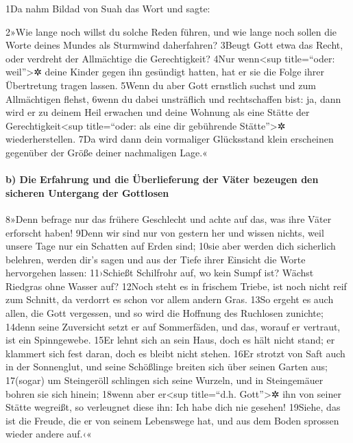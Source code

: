 1Da nahm Bildad von Suah das Wort und sagte:

2»Wie lange noch willst du solche Reden führen, und wie lange noch
sollen die Worte deines Mundes als Sturmwind daherfahren? 3Beugt Gott
etwa das Recht, oder verdreht der Allmächtige die Gerechtigkeit? 4Nur
wenn\textless sup title=``oder: weil''\textgreater✲ deine Kinder gegen
ihn gesündigt hatten, hat er sie die Folge ihrer Übertretung tragen
lassen. 5Wenn du aber Gott ernstlich suchst und zum Allmächtigen flehst,
6wenn du dabei unsträflich und rechtschaffen bist: ja, dann wird er zu
deinem Heil erwachen und deine Wohnung als eine Stätte der
Gerechtigkeit\textless sup title=``oder: als eine dir gebührende
Stätte''\textgreater✲ wiederherstellen. 7Da wird dann dein vormaliger
Glücksstand klein erscheinen gegenüber der Größe deiner nachmaligen
Lage.«

\hypertarget{b-die-erfahrung-und-die-uxfcberlieferung-der-vuxe4ter-bezeugen-den-sicheren-untergang-der-gottlosen}{%
\paragraph{b) Die Erfahrung und die Überlieferung der Väter bezeugen den
sicheren Untergang der
Gottlosen}\label{b-die-erfahrung-und-die-uxfcberlieferung-der-vuxe4ter-bezeugen-den-sicheren-untergang-der-gottlosen}}

8»Denn befrage nur das frühere Geschlecht und achte auf das, was ihre
Väter erforscht haben! 9Denn wir sind nur von gestern her und wissen
nichts, weil unsere Tage nur ein Schatten auf Erden sind; 10sie aber
werden dich sicherlich belehren, werden dir's sagen und aus der Tiefe
ihrer Einsicht die Worte hervorgehen lassen: 11›Schießt Schilfrohr auf,
wo kein Sumpf ist? Wächst Riedgras ohne Wasser auf? 12Noch steht es in
frischem Triebe, ist noch nicht reif zum Schnitt, da verdorrt es schon
vor allem andern Gras. 13So ergeht es auch allen, die Gott vergessen,
und so wird die Hoffnung des Ruchlosen zunichte; 14denn seine Zuversicht
setzt er auf Sommerfäden, und das, worauf er vertraut, ist ein
Spinngewebe. 15Er lehnt sich an sein Haus, doch es hält nicht stand; er
klammert sich fest daran, doch es bleibt nicht stehen. 16Er strotzt von
Saft auch in der Sonnenglut, und seine Schößlinge breiten sich über
seinen Garten aus; 17(sogar) um Steingeröll schlingen sich seine
Wurzeln, und in Steingemäuer bohren sie sich hinein; 18wenn aber
er\textless sup title=``d.h. Gott''\textgreater✲ ihn von seiner Stätte
wegreißt, so verleugnet diese ihn: Ich habe dich nie gesehen! 19Siehe,
das ist die Freude, die er von seinem Lebenswege hat, und aus dem Boden
sprossen wieder andere auf.‹«

